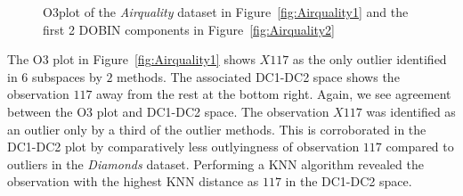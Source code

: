 \documentclass[11pt]{article}
\begin{document}
\begin{figure}[!t]
	\centering
	\caption{O3plot of the \textit{Airquality} dataset in Figure~\ref{fig:Airquality1} and the first 2 DOBIN components in Figure~\ref{fig:Airquality2} }
	\label{fig:Airquality}
\end{figure}
The O3 plot in Figure~\ref{fig:Airquality1} shows $X117$ as the only outlier identified in $6$ subspaces by $2$ methods. The associated DC1-DC2 space shows the observation $117$ away from the rest at the bottom right. Again, we see agreement between the O3 plot and DC1-DC2 space. The observation $X117$ was identified as an outlier only by a third of the outlier methods. This is corroborated in the DC1-DC2 plot by comparatively less outlyingness of observation $117$ compared to  outliers in the \textit{Diamonds} dataset. Performing a KNN algorithm revealed the observation with the highest KNN distance as $117$ in the DC1-DC2 space. \\
\end{document}
